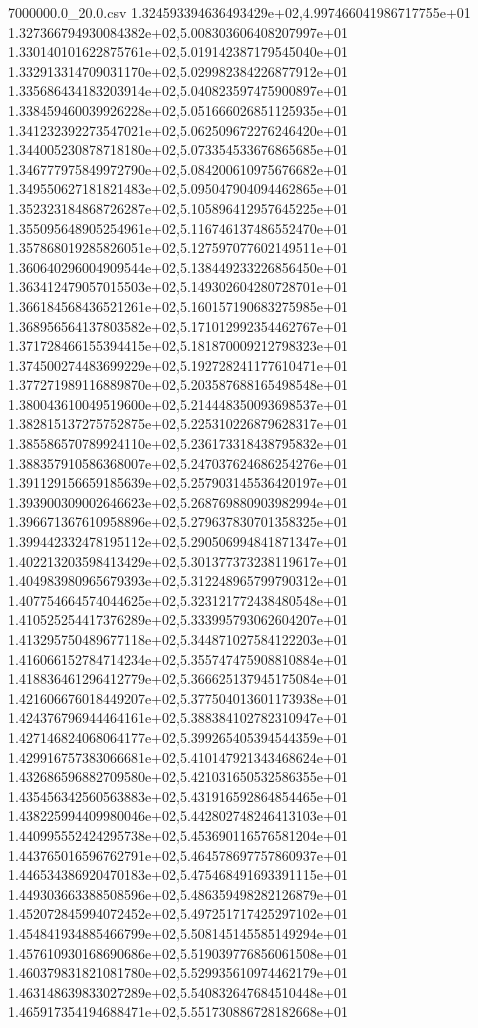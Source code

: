 \begin{filecontents*}{7000000.0_20.0.csv}
1.324593394636493429e+02,4.997466041986717755e+01
1.327366794930084382e+02,5.008303606408207997e+01
1.330140101622875761e+02,5.019142387179545040e+01
1.332913314709031170e+02,5.029982384226877912e+01
1.335686434183203914e+02,5.040823597475900897e+01
1.338459460039926228e+02,5.051666026851125935e+01
1.341232392273547021e+02,5.062509672276246420e+01
1.344005230878718180e+02,5.073354533676865685e+01
1.346777975849972790e+02,5.084200610975676682e+01
1.349550627181821483e+02,5.095047904094462865e+01
1.352323184868726287e+02,5.105896412957645225e+01
1.355095648905254961e+02,5.116746137486552470e+01
1.357868019285826051e+02,5.127597077602149511e+01
1.360640296004909544e+02,5.138449233226856450e+01
1.363412479057015503e+02,5.149302604280728701e+01
1.366184568436521261e+02,5.160157190683275985e+01
1.368956564137803582e+02,5.171012992354462767e+01
1.371728466155394415e+02,5.181870009212798323e+01
1.374500274483699229e+02,5.192728241177610471e+01
1.377271989116889870e+02,5.203587688165498548e+01
1.380043610049519600e+02,5.214448350093698537e+01
1.382815137275752875e+02,5.225310226879628317e+01
1.385586570789924110e+02,5.236173318438795832e+01
1.388357910586368007e+02,5.247037624686254276e+01
1.391129156659185639e+02,5.257903145536420197e+01
1.393900309002646623e+02,5.268769880903982994e+01
1.396671367610958896e+02,5.279637830701358325e+01
1.399442332478195112e+02,5.290506994841871347e+01
1.402213203598413429e+02,5.301377373238119617e+01
1.404983980965679393e+02,5.312248965799790312e+01
1.407754664574044625e+02,5.323121772438480548e+01
1.410525254417376289e+02,5.333995793062604207e+01
1.413295750489677118e+02,5.344871027584122203e+01
1.416066152784714234e+02,5.355747475908810884e+01
1.418836461296412779e+02,5.366625137945175084e+01
1.421606676018449207e+02,5.377504013601173938e+01
1.424376796944464161e+02,5.388384102782310947e+01
1.427146824068064177e+02,5.399265405394544359e+01
1.429916757383066681e+02,5.410147921343468624e+01
1.432686596882709580e+02,5.421031650532586355e+01
1.435456342560563883e+02,5.431916592864854465e+01
1.438225994409980046e+02,5.442802748246413103e+01
1.440995552424295738e+02,5.453690116576581204e+01
1.443765016596762791e+02,5.464578697757860937e+01
1.446534386920470183e+02,5.475468491693391115e+01
1.449303663388508596e+02,5.486359498282126879e+01
1.452072845994072452e+02,5.497251717425297102e+01
1.454841934885466799e+02,5.508145145585149294e+01
1.457610930168690686e+02,5.519039776856061508e+01
1.460379831821081780e+02,5.529935610974462179e+01
1.463148639833027289e+02,5.540832647684510448e+01
1.465917354194688471e+02,5.551730886728182668e+01

\end{filecontents*}
